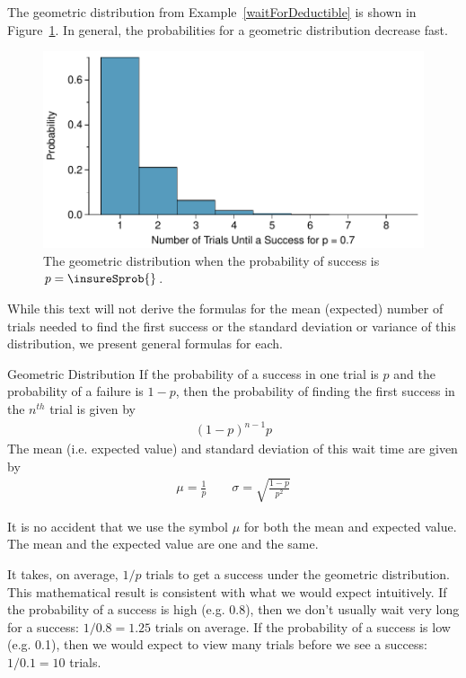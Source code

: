 The geometric distribution from Example~\ref{waitForDeductible} is shown in Figure~\ref{geometricDist70}. In general, the probabilities for a geometric distribution decrease  fast.

\begin{figure}[h]
  \centering
  \includegraphics{ch_distributions/figures/geometricDist70/geometricDist70}
  \caption{The geometric distribution when the probability
      of success is $p = \insureSprob{}$.}
  \label{geometricDist70}
\end{figure}

While this text will not derive the formulas for the mean (expected) number of trials needed to find the first success or the standard deviation or variance of this distribution, we present general formulas for each.

\begin{onebox}{Geometric Distribution}
  If the probability of a success in one trial is $p$
  and the probability of a failure is $1-p$, then the
  probability of finding the first success in the
  $n^{th}$ trial is given by\vspace{-1.5mm}
  \begin{align*}
  (1-p)^{n-1}p
  \end{align*}
  The mean (i.e. expected value) and standard deviation of this wait time are given by
  \begin{align*}
  \mu = \frac{1}{p}
      \qquad \sigma = \sqrt{\frac{1-p}{p^2}}
  \end{align*}
\end{onebox}

It is no accident that we use the symbol $\mu$ for both the mean and expected value. The mean and the expected value are one and the same.

It takes, on average, $1/p$ trials to get a success under the geometric distribution. This mathematical result is consistent with what we would expect intuitively. If the probability of a success is high (e.g. 0.8), then we don't usually wait very long for a success: $1/0.8 = 1.25$ trials on average. If the probability of a success is low (e.g. 0.1), then we would expect to view many trials before we see a success: $1/0.1 = 10$ trials.

